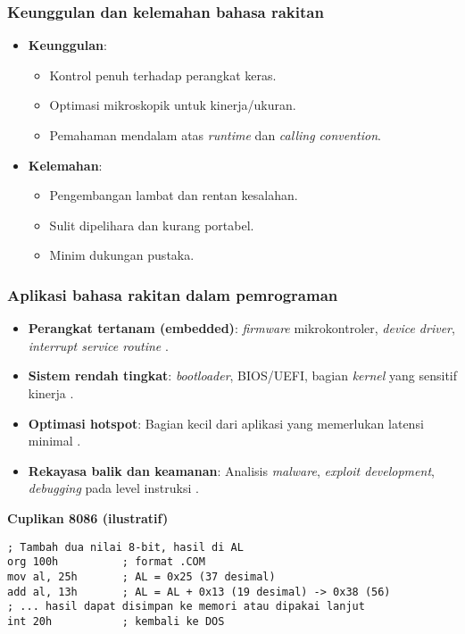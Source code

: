 \subsubsection{Keunggulan dan kelemahan bahasa rakitan}
\begin{itemize}
    \item \textbf{Keunggulan}:
    \begin{itemize}
        \item Kontrol penuh terhadap perangkat keras.
        \item Optimasi mikroskopik untuk kinerja/ukuran.
        \item Pemahaman mendalam atas \textit{runtime} dan \textit{calling convention}.
    \end{itemize}
    \item \textbf{Kelemahan}:
    \begin{itemize}
        \item Pengembangan lambat dan rentan kesalahan.
        \item Sulit dipelihara dan kurang portabel.
        \item Minim dukungan pustaka.
    \end{itemize}
\end{itemize}

\subsubsection{Aplikasi bahasa rakitan dalam pemrograman}
\begin{itemize}
    \item \textbf{Perangkat tertanam (embedded)}: \textit{firmware} mikrokontroler, \textit{device driver}, \textit{interrupt service routine} \cite{hyde2010art}.
    \item \textbf{Sistem rendah tingkat}: \textit{bootloader}, BIOS/UEFI, bagian \textit{kernel} yang sensitif kinerja \cite{intel2019manual32}.
    \item \textbf{Optimasi hotspot}: Bagian kecil dari aplikasi yang memerlukan latensi minimal \cite{susanto1995belajar}.
    \item \textbf{Rekayasa balik dan keamanan}: Analisis \textit{malware}, \textit{exploit development}, \textit{debugging} pada level instruksi \cite{hyde2010art}.
\end{itemize}

\noindent\textbf{Cuplikan 8086 (ilustratif)}
\begin{verbatim}
; Tambah dua nilai 8-bit, hasil di AL
org 100h          ; format .COM
mov al, 25h       ; AL = 0x25 (37 desimal)
add al, 13h       ; AL = AL + 0x13 (19 desimal) -> 0x38 (56)
; ... hasil dapat disimpan ke memori atau dipakai lanjut
int 20h           ; kembali ke DOS
\end{verbatim}

